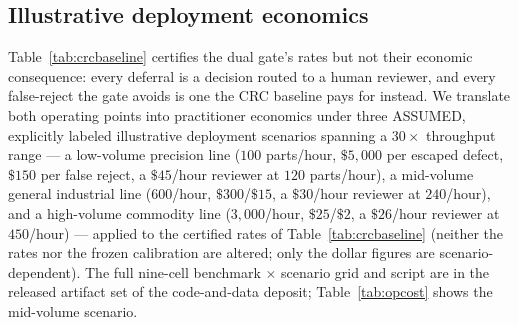 \documentclass[preprint,11pt]{elsarticle}
\begin{document}
\subsection{Illustrative deployment economics}
\label{sec:opcost}

Table~\ref{tab:crcbaseline} certifies the dual gate's rates but not their economic
consequence: every deferral is a decision routed to a human reviewer, and every
false-reject the gate avoids is one the CRC baseline pays for instead. We translate
both operating points into practitioner economics under three ASSUMED, explicitly
labeled illustrative deployment scenarios spanning a $30\times$ throughput range --- a
low-volume precision line ($100$ parts/hour, $\$5{,}000$ per escaped defect, $\$150$
per false reject, a $\$45$/hour reviewer at $120$ parts/hour), a mid-volume general
industrial line ($600$/hour, $\$300$/$\$15$, a $\$30$/hour reviewer at $240$/hour), and
a high-volume commodity line ($3{,}000$/hour, $\$25$/$\$2$, a $\$26$/hour reviewer at
$450$/hour) --- applied to the certified rates of Table~\ref{tab:crcbaseline} (neither
the rates nor the frozen calibration are altered; only the dollar figures are
scenario-dependent). The full nine-cell benchmark $\times$ scenario grid and script are
in the released artifact set of the code-and-data deposit; Table~\ref{tab:opcost}
shows the mid-volume scenario.
\end{document}
